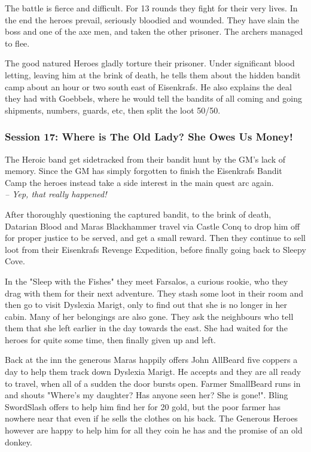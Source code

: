 The battle is fierce and difficult. For 13 rounds they fight for their very lives. In the end the heroes prevail, seriously bloodied and wounded. They have slain the boss and one of the axe men, and taken the other prisoner. The archers managed to flee.

The good natured Heroes gladly torture their prisoner. Under significant blood letting, leaving him at the brink of death, he tells them about the hidden bandit camp about an hour or two south east of Eisenkrafs. He also explains the deal they had with Goebbels, where he would tell the bandits of all coming and going shipments, numbers, guards, etc, then split the loot 50/50.


\subsubsection*{Session 17: Where is The Old Lady? She Owes Us Money!}
\begin{readoutloud}
The Heroic band get sidetracked from their bandit hunt by the GM's lack of memory. Since the GM has simply forgotten to finish the Eisenkrafs Bandit Camp the heroes instead take a side interest in the main quest arc again.\\
\emph{-- Yep, that really happened!}
\end{readoutloud}

After thoroughly questioning the captured bandit, to the brink of death, Datarian Blood and Maras Blackhammer travel via Castle Conq to drop him off for proper justice to be served, and get a small reward. Then they continue to sell loot from their Eisenkrafs Revenge Expedition, before finally going back to Sleepy Cove.

In the "Sleep with the Fishes" they meet Farsalos, a curious rookie, who they drag with them for their next adventure. They stash some loot in their room and then go to visit Dyslexia Marigt, only to find out that she is no longer in her cabin. Many of her belongings are also gone. They ask the neighbours who tell them that she left earlier in the day towards the east. She had waited for the heroes for quite some time, then finally given up and left.

Back at the inn the generous Maras happily offers John AllBeard five coppers a day to help them track down Dyslexia Marigt. He accepts and they are all ready to travel, when all of a sudden the door bursts open. Farmer SmallBeard runs in and shouts "Where's my daughter? Has anyone seen her? She is gone!". Bling SwordSlash offers to help him find her for 20 gold, but the poor farmer has nowhere near that even if he sells the clothes on his back. The Generous Heroes however are happy to help him for all they coin he has and the promise of an old donkey.

